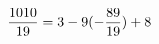 \documentclass[preview]{standalone}
\begin{document}
\begin{align*}
\special{dvisvgm:raw <g id='unique000'>}\frac{1010}{19} = 3 - 9 (- \frac{89}{19}) + 8\special{dvisvgm:raw </g>}
\end{align*}
\end{document}
